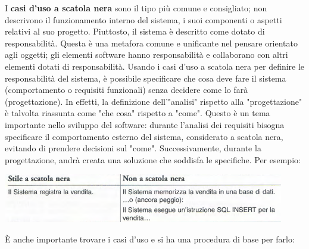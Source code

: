 \documentclass[a4paper,12pt, oneside]{book}
\begin{document}
I \textbf{casi d'uso a scatola nera }sono il tipo più comune e consigliato; non descrivono il funzionamento interno del sistema, i suoi componenti o aspetti relativi al suo progetto. Piuttosto, il sistema è descritto come dotato di responsabilità. Questa è una metafora comune e unificante nel pensare orientato agli oggetti; gli elementi software hanno responsabilità e collaborano con altri elementi dotati di responsabilità. Usando i casi d'uso a scatola nera per definire le responsabilità del sistema, è possibile specificare che cosa deve fare il sistema (comportamento o requisiti funzionali) senza decidere come lo farà (progettazione). In effetti, la definizione dell'"analisi" rispetto alla "progettazione" è talvolta riassunta come "che cosa" rispetto a "come". Questo è un tema importante nello sviluppo del software: durante l'analisi dei requisiti bisogna specificare il comportamento esterno del sistema, considerato a scatola nera, evitando di prendere decisioni sul "come". Successivamente, durante la progettazione, andrà creata una soluzione che soddisfa le specifiche. 
\newpage
Per esempio:
\begin{center}
	\includegraphics[scale=0.7]{img/box.png}
\end{center}
È anche importante trovare i casi d'uso e si ha una procedura di base per farlo:
\end{document}
